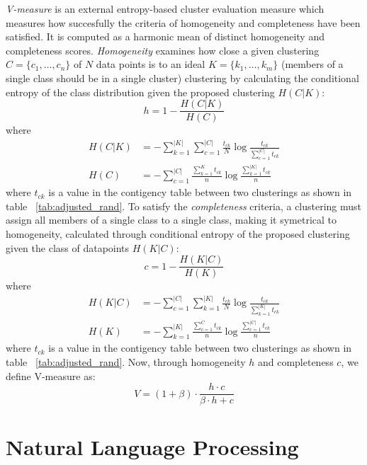 \textit{V-measure} is an external entropy-based cluster evaluation measure which measures
how succesfully the criteria of homogeneity and completeness have been satisfied. 
\citep{rosenberg2007v}
It is computed as a harmonic mean of distinct homogeneity and completeness scores. 
\textit{Homogeneity} examines how close a given clustering $C = \{c_1, \dots, c_n\}$ of 
$N$ data points is to an ideal $K = \{k_1, \dots, k_m\}$ (members of a single
class should be in a single cluster) clustering by calculating the 
conditional entropy of the class distribution given the proposed clustering 
$H(C | K)$:
$$
h = 1 - \frac{H(C | K)}{H(C)}
$$
where 
\begin{align*} 
	H(C | K) &= - \sum_{k=1}^{|K|}\sum_{c=1}^{|C|} \frac{t_{ck}}{N}\log \frac{t_{ck}}{\sum_{c=1}^{|C|} t_{ck}} \\
	H(C) &= - \sum_{c=1}^{|C|} \frac{\sum_{k=1}^{K} t_{ck}}{n} \log \frac{\sum_{k=1}^{|K|} t_{ck}}{n}
\end{align*}
where $t_{ck}$ is a value in the contigency table between two clusterings as shown in table~
\ref{tab:adjusted_rand}.
To satisfy the \textit{completeness} criteria, a clustering must assign all 
members of a single class to a single class, making it symetrical to 
homogeneity, calculated through conditional entropy of the proposed clustering
given the class of datapoints $H(K | C)$:
$$
c = 1 - \frac{H(K | C)}{H(K)}
$$
where
\begin{align*}
H(K | C) &= - \sum_{c=1}^{|C|}\sum_{k=1}^{|K|} \frac{t_{ck}}{N} \log \frac{t_{ck}}{\sum_{k=1}^{|K|} t_{ck}} \\
H(K) &= - \sum_{k=1}^{|K|} \frac{\sum_{c=1}^{C} t_{ck}}{n} \log \frac{\sum_{c=1}^{|C|} t_{ck}}{n}
\end{align*}
where $t_{ck}$ is a value in the contigency table between two clusterings as shown in table~
\ref{tab:adjusted_rand}.
Now, through homogeneity $h$ and completeness $c$, we define V-measure as:
\begin{equation}\label{eq:v-measure}
	V = (1 + \beta) \cdot \frac{h \cdot c}{\beta \cdot h + c}
\end{equation}


\section{Natural Language Processing}
\label{sec:natural_language_processing}

